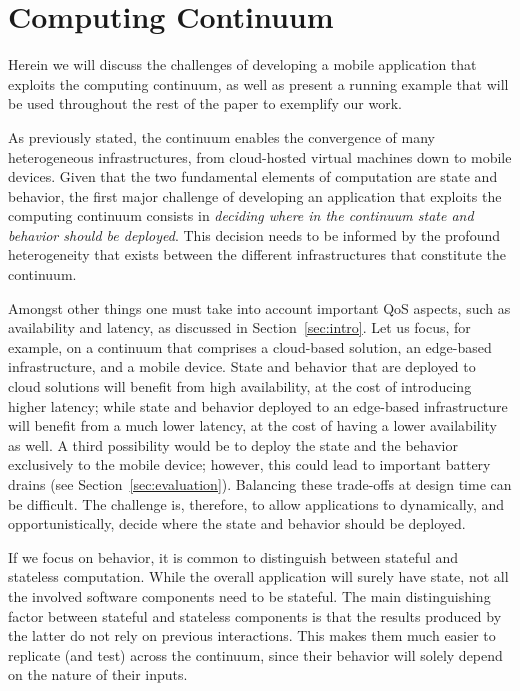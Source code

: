 \section{Computing Continuum}
\label{sec:example}

Herein we will discuss the challenges of developing a mobile application that exploits the computing continuum, as well as present a running example that will be used throughout the rest of the paper to exemplify our work.

As previously stated, the continuum enables the convergence of many heterogeneous infrastructures, from cloud-hosted virtual machines down to mobile devices. Given that the two fundamental elements of computation are state and behavior, the first major challenge of developing an application that exploits the computing continuum consists in \emph{deciding where in the continuum state and behavior should be deployed}. This decision needs to be informed by the profound heterogeneity that exists between the different infrastructures that constitute the continuum. 

Amongst other things one must take into account important QoS aspects, such as availability and latency, as discussed in Section~\ref{sec:intro}. Let us focus, for example, on a continuum that comprises a cloud-based solution, an edge-based infrastructure, and a mobile device. State and behavior that are deployed to cloud solutions will benefit from high availability, at the cost of introducing higher latency; while state and behavior deployed to an edge-based infrastructure will benefit from a much lower latency, at the cost of having a lower availability as well. A third possibility would be to deploy the state and the behavior exclusively to the mobile device; however, this could lead to important battery drains (see Section~\ref{sec:evaluation}). Balancing these trade-offs at design time can be difficult. The challenge is, therefore, to allow applications to dynamically, and opportunistically, decide where the state and behavior should be deployed. 

If we focus on behavior, it is common to distinguish between stateful and stateless computation. While the overall application will surely have state, not all the involved software components need to be stateful. The main distinguishing factor between stateful and stateless components is that the results produced by the latter do not rely on previous interactions. This makes them much easier to replicate (and test) across the continuum, since their behavior will solely depend on the nature of their inputs. 

